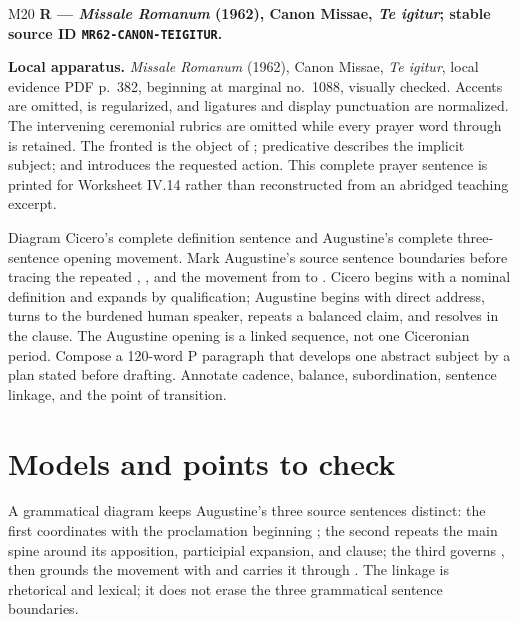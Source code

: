 \begin{courseunit}{M20}
\textbf{R --- \textit{Missale Romanum} (1962), Canon Missae,
\textit{Te igitur}; stable source ID \texttt{MR62-CANON-TEIGITUR}.}


\textbf{Local apparatus.} \textit{Missale Romanum} (1962), Canon Missae,
\textit{Te igitur}, local evidence PDF p.~382, beginning at marginal
no.~1088, visually checked.  Accents are omitted,  is regularized,
and ligatures and display punctuation are normalized.  The intervening
ceremonial rubrics are omitted while every prayer word through
 is retained.  The
fronted  is the object of ; predicative
 describes the implicit subject; and  introduces
the requested action.  This complete prayer sentence is printed for Worksheet
IV.14 rather than reconstructed from an abridged teaching excerpt.

Diagram Cicero's complete definition sentence and Augustine's complete
three-sentence opening movement.  Mark Augustine's source sentence boundaries
before tracing the repeated , ,
and the movement from  to .  Cicero begins with a nominal
definition and expands by qualification; Augustine begins with direct address,
turns to the burdened human speaker, repeats a balanced claim, and resolves in
the  clause.  The Augustine opening is a linked sequence, not one
Ciceronian period.  Compose a 120-word P paragraph that develops one abstract
subject by a plan stated before drafting.  Annotate cadence, balance,
subordination, sentence linkage, and the point of transition.

\ifsolutions
\section{Models and points to check}
A grammatical diagram keeps Augustine's three source sentences distinct:
the first coordinates  with the proclamation beginning
; the second repeats the main spine
 around its apposition, participial expansion, and
 clause; the third governs , then
grounds the movement with  and carries it through
.  The linkage is rhetorical and lexical; it does not
erase the three grammatical sentence boundaries.


\end{courseunit}

